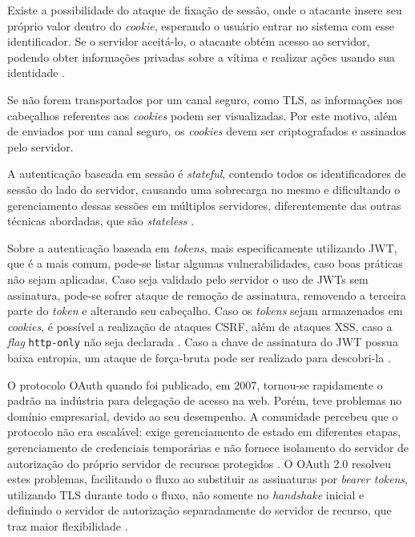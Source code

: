 Existe a possibilidade do ataque de fixação de sessão, onde o atacante insere seu próprio valor
dentro do \emph{cookie}, esperando o usuário entrar no sistema com esse identificador. Se o servidor
aceitá-lo, o atacante obtém acesso ao servidor, podendo obter informações privadas sobre a vítima
e realizar ações usando sua identidade \cite{DRHOVA2018}.

Se não forem transportados por um canal seguro, como TLS, as informações nos cabeçalhos referentes 
aos \emph{cookies} podem ser visualizadas. Por este motivo, além de enviados por um canal seguro, 
os \emph{cookies} devem ser criptografados e assinados pelo servidor\cite{RFC6265}.

A autenticação baseada em sessão é \emph{stateful}, contendo todos os identificadores de sessão do
lado do servidor, causando uma sobrecarga no mesmo e dificultando o gerenciamento dessas sessões em
múltiplos servidores, diferentemente das outras técnicas abordadas, que são \emph{stateless} 
\cite{BALAJ2017}.


Sobre a autenticação baseada em \emph{tokens}, mais especificamente utilizando JWT, que é a mais 
comum, pode-se listar algumas vulnerabilidades, caso boas práticas não sejam aplicadas. Caso seja
validado pelo servidor o uso de JWTs sem assinatura, pode-se sofrer ataque de remoção de assinatura,
removendo a terceira parte do \emph{token} e alterando seu cabeçalho. Caso os \emph{tokens} sejam
armazenados em \emph{cookies}, é possível a realização de ataques CSRF, além de ataques XSS, caso a
\emph{flag} \texttt{http-only} não seja declarada \cite{PEYROTT2018}. Caso a chave de assinatura
do JWT possua baixa entropia, um ataque de força-bruta pode ser realizado para descobri-la 
\cite{RFC7515}.

O protocolo OAuth quando foi publicado, em 2007, tornou-se rapidamente o padrão na indústria para 
delegação de acesso na web. Porém, teve problemas no domínio empresarial, devido ao seu desempenho. 
A comunidade percebeu que o protocolo não era escalável: exige gerenciamento de estado em diferentes 
etapas, gerenciamento de credenciais temporárias e não fornece isolamento do servidor de autorização 
do próprio servidor de recursos protegidos \cite{NOUREDDINE2011}. O OAuth 2.0 resolveu estes 
problemas, facilitando o fluxo ao substituir as assinaturas por \emph{bearer tokens}, utilizando TLS 
durante todo o fluxo, não somente no \emph{handshake} inicial e definindo o servidor de autorização 
separadamente do servidor de recurso, que traz maior flexibilidade \cite{SIRIWARDENA2014}.

